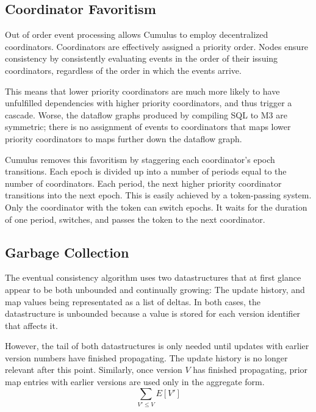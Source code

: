 \documentclass{vldb}
\begin{document}

\subsection{Coordinator Favoritism}

Out of order event processing allows Cumulus to employ decentralized coordinators.  Coordinators are effectively assigned a priority order.  Nodes ensure consistency by consistently evaluating events in the order of their issuing coordinators, regardless of the order in which the events arrive.

This means that lower priority coordinators are much more likely to have unfulfilled dependencies with higher priority coordinators, and thus trigger a cascade.  Worse, the dataflow graphs produced by compiling SQL to M3 are symmetric; there is no assignment of events to coordinators that maps lower priority coordinators to maps further down the dataflow graph.

Cumulus removes this favoritism by staggering each coordinator's epoch transitions.  Each epoch is divided up into a number of periods equal to the number of coordinators.  Each period, the next higher priority coordinator transitions into the next epoch.  This is easily achieved by a token-passing system.  Only the coordinator with the token can switch epochs.  It waits for the duration of one period, switches, and passes the token to the next coordinator.

\subsection{Garbage Collection}
The eventual consistency algorithm uses two datastructures that at first glance appear to be both unbounded and continually growing: The update history, and map values being representated as a list of deltas.  In both cases, the datastructure is unbounded because a value is stored for each version identifier that affects it. 

However, the tail of both datastructures is only needed until updates with earlier version numbers have finished propagating.  The update history is no longer relevant after this point.  Similarly, once version $V$ has finished propagating, prior map entries with earlier versions are used only in the aggregate form.
$$\sum_{V' \leq V} E[V']$$
\end{document}
